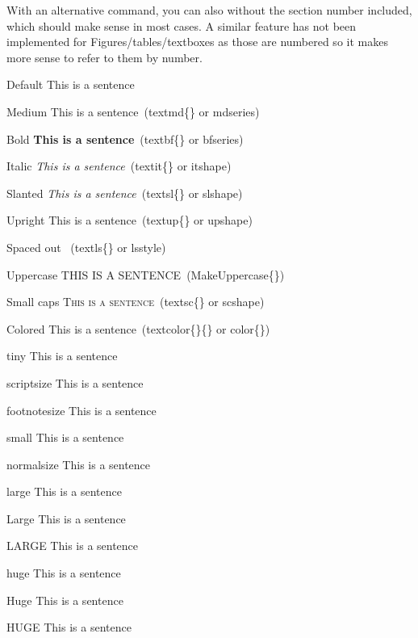 With an alternative command, you can also  without the section number included, which should make sense in most cases. A similar feature has not been implemented for Figures/tables/textboxes as those are numbered so it makes more sense to refer to them by number.


\newcommand\demoString{This is a sentence}

\begin{myListMeta}
  \item[Default] \demoString
  \item[Medium] \textmd{\demoString}\ (textmd\{\} or mdseries)
  \item[Bold] \textbf{\demoString}\ (textbf\{\} or bfseries)
  \item[Italic] \textit{\demoString}\ (textit\{\} or itshape)
  \item[Slanted] \textsl{\demoString}\ (textsl\{\} or slshape)
  \item[Upright] \textup{\demoString}\ (textup\{\} or upshape)
  \item[Spaced out] \textls{\demoString} \ (textls\{\} or lsstyle) %
  \item[Uppercase] \MakeUppercase{\demoString}\ (MakeUppercase\{\})
  \item[Small caps] \textsc{\demoString}\ (textsc\{\} or scshape)
  \item[Colored] \textcolor{myColorSuccess}{\demoString}\ (textcolor\{\}\{\} or color\{\})
\end{myListMeta}

\begin{myListMeta}
  \item[tiny] {\tiny\demoString}
  \item[scriptsize] {\scriptsize\demoString}
  \item[footnotesize] {\footnotesize\demoString}
  \item[small] {\small\demoString}
  \item[normalsize] {\normalsize\demoString}
  \item[large] {\large\demoString}
  \item[Large] {\Large\demoString}
  \item[LARGE] {\LARGE\demoString}
  \item[huge] {\huge\demoString}
  \item[Huge] {\Huge\demoString}
  \item[HUGE] {\HUGE\demoString}
\end{myListMeta}


